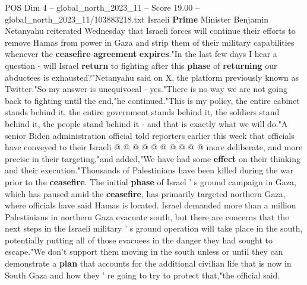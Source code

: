\begin{textsample}{POS Dim 4 – global\_north\_2023\_11 – Score 19.00 – global\_north\_2023\_11/103883218.txt}
Israeli \textbf{Prime} Minister Benjamin Netanyahu reiterated Wednesday that Israeli forces will continue their efforts to remove Hamas from power in Gaza and strip them of their military capabilities whenever the \textbf{ceasefire} \textbf{agreement} \textbf{expires}."In the last few days I hear a question - will Israel \textbf{return} to fighting after this \textbf{phase} of \textbf{returning} our abductees is exhausted?"Netanyahu said on X, the platform previously known as Twitter."So my answer is unequivocal - yes."There is no way we are not going back to fighting until the end,"he continued."This is my policy, the entire cabinet stands behind it, the entire government stands behind it, the soldiers stand behind it, the people stand behind it - and that is exactly what we will do."A senior Biden administration official told reporters earlier this week that officials have conveyed to their Israeli @ @ @ @ @ @ @ @ @ @ more deliberate, and more precise in their targeting,"and added,"We have had some \textbf{effect} on their thinking and their execution."Thousands of Palestinians have been killed during the war prior to the \textbf{ceasefire}.
The initial \textbf{phase} of Israel ' s ground campaign in Gaza, which has paused amid the \textbf{ceasefire}, has primarily targeted northern Gaza, where officials have said Hamas is located.
Israel demanded more than a million Palestinians in northern Gaza evacuate south, but there are concerns that the next steps in the Israeli military ' s ground operation will take place in the south, potentially putting all of those evacuees in the danger they had sought to escape."We don't support them moving in the south unless or until they can demonstrate a \textbf{plan} that accounts for the additional civilian life that is now in South Gaza and how they ' re going to try to protect that,"the official said.

\end{textsample}
